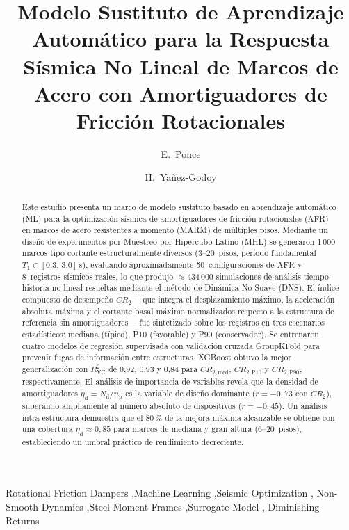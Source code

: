\documentclass[preprint,12pt,authoryear]{elsarticle}
\newcommand{\CR}[1]{CR_{2,\text{#1}}}
\newcommand{\Rsq}{R^{2}_{\mathrm{VC}}}
\newcommand{\nd}{N_{\mathrm{d}}}
\newcommand{\np}{n_{\mathrm{p}}}              %
\newcommand{\etad}{\eta_{\mathrm{d}}}
\begin{document}
\begin{frontmatter}

\title{Modelo Sustituto de Aprendizaje Automático para la Respuesta Sísmica
       No Lineal de Marcos de Acero con Amortiguadores de Fricción Rotacionales}

\author[uaq]{E.~Ponce}
\author[i2m]{H.~Yañez-Godoy}

\address[uaq]{Universidad Autónoma de Querétaro, Facultad de Ingeniería,
              Cerro de las Campanas s/n, Querétaro, México}
\address[i2m]{Arts et Metiers Institute of Technology, University of Bordeaux,
              Centre National de la Recherche Scientifique (CNRS),
              Bordeaux INP, I2M, UMR 5295, 33400 Talence, France}

\begin{abstract}
Este estudio presenta un marco de modelo sustituto basado en aprendizaje
automático (ML) para la optimización sísmica de amortiguadores de fricción
rotacionales (AFR) en marcos de acero resistentes a momento (MARM) de múltiples
pisos. Mediante un diseño de experimentos por Muestreo por Hipercubo Latino
(MHL) se generaron 1\,000 marcos tipo cortante estructuralmente diversos
(3--20~pisos, período fundamental $T_1 \in [0.3,\,3.0]$\,s), evaluando
aproximadamente 50~configuraciones de AFR y 8~registros sísmicos reales, lo que
produjo $\approx$434\,000 simulaciones de análisis tiempo-historia no lineal
resueltas mediante el método de Dinámica No Suave (DNS). El índice compuesto de
desempeño $CR_2$ ---que integra el desplazamiento máximo, la aceleración
absoluta máxima y el cortante basal máximo normalizados respecto a la estructura
de referencia sin amortiguadores--- fue sintetizado sobre los registros en tres
escenarios estadísticos: mediana (típico), P10 (favorable) y P90 (conservador).
Se entrenaron cuatro modelos de regresión supervisada con validación cruzada
GroupKFold para prevenir fugas de información entre estructuras. XGBoost obtuvo
la mejor generalización con $\Rsq$ de 0{,}92, 0{,}93 y 0{,}84 para
$\CR{med}$, $\CR{P10}$ y $\CR{P90}$, respectivamente. El análisis de
importancia de variables revela que la densidad de amortiguadores
$\etad = \nd/\np$ es la variable de diseño dominante ($r=-0{,}73$ con
$CR_2$), superando ampliamente al número absoluto de dispositivos
($r=-0{,}45$). Un análisis intra-estructura demuestra que el 80\,\% de la
mejora máxima alcanzable se obtiene con una cobertura $\etad \approx 0{,}85$
para marcos de mediana y gran altura (6--20~pisos), estableciendo un umbral
práctico de rendimiento decreciente.
\end{abstract}

\begin{keyword}
Rotational Friction Dampers \sep Machine Learning \sep Seismic Optimization \sep
Non-Smooth Dynamics \sep Steel Moment Frames \sep Surrogate Model \sep
Diminishing Returns
\end{keyword}

\end{frontmatter}
\end{document}

